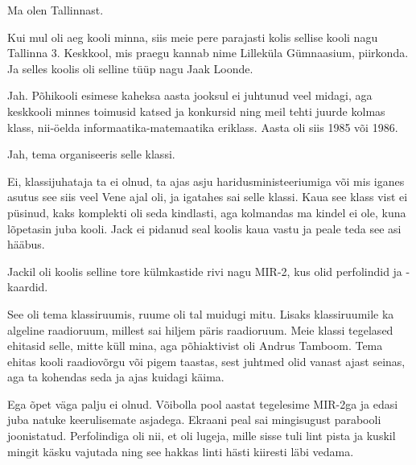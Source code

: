 
Ma olen Tallinnast.


Kui mul oli aeg kooli minna, siis 
meie pere parajasti kolis sellise kooli nagu Tallinna 3. 
Keskkool, mis praegu kannab nime
Lilleküla Gümnaasium, piirkonda. Ja selles koolis oli 
selline tüüp nagu Jaak Loonde.


Jah. Põhikooli esimese kaheksa aasta jooksul ei 
juhtunud veel midagi, aga keskkooli minnes toimusid 
katsed ja konkursid ning meil tehti juurde kolmas klass, 
nii-öelda informaatika-matemaatika eriklass. Aasta oli siis 1985 või 1986.


Jah, tema organiseeris selle klassi.


Ei, klassijuhataja ta ei olnud, ta ajas asju haridusministeeriumiga või 
mis iganes asutus see siis veel Vene ajal oli, ja igatahes sai 
selle klassi. Kaua see klass vist ei püsinud, kaks 
komplekti oli seda kindlasti, aga kolmandas ma kindel ei ole, kuna 
lõpetasin juba kooli. Jack ei pidanud seal koolis kaua vastu ja peale 
teda see asi hääbus. 

Jackil oli koolis selline tore külmkastide rivi nagu 
MIR-2, kus olid perfolindid ja -kaardid.


See oli tema klassiruumis, ruume oli tal muidugi mitu. Lisaks 
klassiruumile ka algeline raadioruum, millest sai hiljem päris raadioruum. 
Meie klassi tegelased ehitasid selle, mitte küll mina, aga põhiaktivist oli Andrus Tamboom. Tema ehitas kooli 
raadiovõrgu või pigem taastas, sest juhtmed olid vanast 
ajast seinas, aga ta kohendas seda ja ajas kuidagi käima.


Ega õpet väga palju ei olnud. Võibolla pool aastat tegelesime
MIR-2ga ja edasi juba natuke 
keerulisemate asjadega. Ekraani peal sai mingisugust parabooli
joonistatud. Perfolindiga oli nii, et oli lugeja, mille sisse tuli lint pista
ja kuskil mingit käsku vajutada ning see hakkas linti hästi 
kiiresti läbi vedama.

